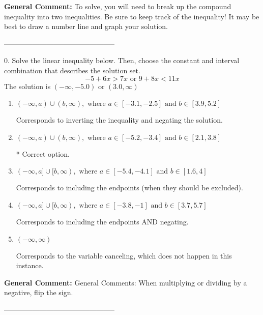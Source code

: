 \documentclass{extbook}[14pt]
\begin{document}
\textbf{General Comment:} To solve, you will need to break up the compound inequality into two inequalities. Be sure to keep track of the inequality! It may be best to draw a number line and graph your solution. 

-----------------------------------------------

0. Solve the linear inequality below. Then, choose the constant and interval combination that describes the solution set.
\[ -5 + 6 x > 7 x \text{ or } 9 + 8 x < 11 x \] 
The solution is $ (-\infty, -5.0) \text{ or } (3.0, \infty) $ 

\begin{enumerate}[label=\Alph*.] 
\item $ (-\infty, a) \cup (b, \infty), \text{ where } a \in [-3.1, -2.5] \text{ and } b \in [3.9, 5.2] $ 

 Corresponds to inverting the inequality and negating the solution. 
\item $ (-\infty, a) \cup (b, \infty), \text{ where } a \in [-5.2, -3.4] \text{ and } b \in [2.1, 3.8] $ 

  * Correct option. 
\item $ (-\infty, a] \cup [b, \infty), \text{ where } a \in [-5.4, -4.1] \text{ and } b \in [1.6, 4] $ 

 Corresponds to including the endpoints (when they should be excluded). 
\item $ (-\infty, a] \cup [b, \infty), \text{ where } a \in [-3.8, -1] \text{ and } b \in [3.7, 5.7] $ 

 Corresponds to including the endpoints AND negating. 
\item $ (-\infty, \infty) $ 

 Corresponds to the variable canceling, which does not happen in this instance. 
\end{enumerate} 
 
\textbf{General Comment:} General Comments: When multiplying or dividing by a negative, flip the sign. 

-----------------------------------------------
\end{document}
